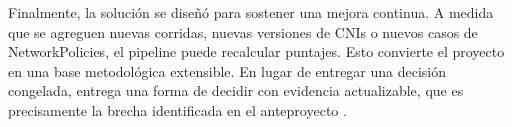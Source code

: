 Finalmente, la solución se diseñó para sostener una mejora continua. A medida que se agreguen nuevas corridas, nuevas versiones de CNIs o nuevos casos de NetworkPolicies, el pipeline puede recalcular puntajes. Esto convierte el proyecto en una base metodológica extensible. En lugar de entregar una decisión congelada, entrega una forma de decidir con evidencia actualizable, que es precisamente la brecha identificada en el anteproyecto \cite{ref29}.
